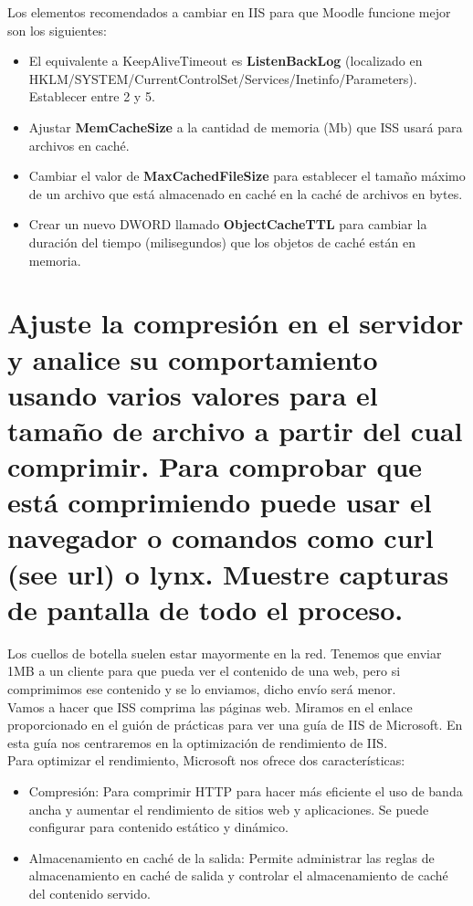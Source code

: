	Los elementos recomendados a cambiar en IIS para que Moodle funcione mejor son los siguientes:
	\begin{itemize}
		\item El equivalente a KeepAliveTimeout es \textbf{ListenBackLog} (localizado en HKLM/SYSTEM/CurrentControlSet/Services/Inetinfo/Parameters). Establecer entre 2 y 5.
		\item Ajustar \textbf{MemCacheSize} a la cantidad de memoria (Mb) que ISS usará para archivos en caché.
		\item Cambiar el valor de \textbf{MaxCachedFileSize} para establecer el tamaño máximo de un archivo que está almacenado en caché en la caché de archivos en bytes.
		\item Crear un nuevo DWORD llamado \textbf{ObjectCacheTTL} para cambiar la duración del tiempo (milisegundos) que los objetos de caché están en memoria.
	\end{itemize}
	
	
	\section{Ajuste la compresión en el servidor y analice su comportamiento usando varios valores para el tamaño de archivo a partir del cual comprimir. Para comprobar que está comprimiendo puede usar el navegador o comandos como curl (see url) o lynx. Muestre capturas de pantalla de todo el proceso.}
	
	
	Los cuellos de botella suelen estar mayormente en la red. Tenemos que enviar 1MB a un cliente para que pueda ver el contenido de una web, pero si comprimimos ese contenido y se lo enviamos, dicho envío será menor.\\
	
	Vamos a hacer que ISS comprima las páginas web. Miramos en el enlace proporcionado en el guión de prácticas para ver una guía de IIS de Microsoft\cite{ejercicio5-1}. En esta guía nos centraremos en la optimización de rendimiento de IIS\cite{ejercicio5-2}.\\
	
	Para optimizar el rendimiento, Microsoft nos ofrece dos características:
	\begin{itemize}
		\item Compresión: Para comprimir HTTP para hacer más eficiente el uso de banda ancha y aumentar el rendimiento de sitios web y aplicaciones. Se puede configurar para contenido estático y dinámico.
		\item Almacenamiento en caché de la salida: Permite administrar las reglas de almacenamiento en caché de salida y controlar el almacenamiento de caché del contenido servido.
	\end{itemize}
	
